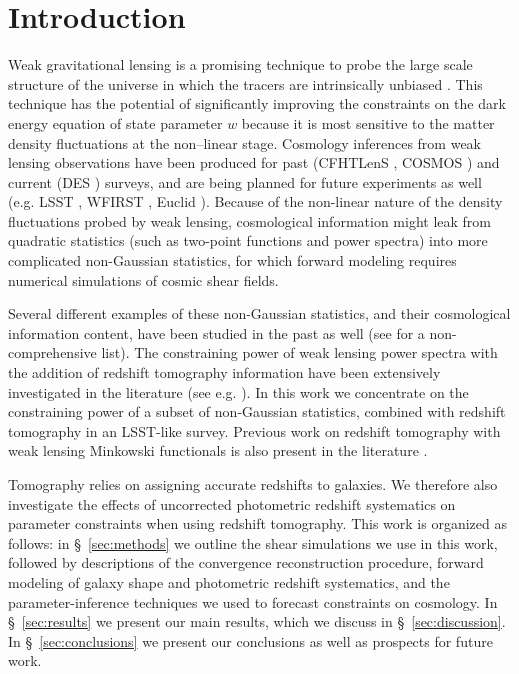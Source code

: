 \documentclass[reprint,aps,prd,superscriptaddress,showkeys,showpacs]{revtex4-1}
\begin{document}
\maketitle



\section{Introduction}
%
Weak gravitational lensing is a promising technique to probe the large scale structure of the universe in which the tracers are intrinsically unbiased \citep{wlreview}. This technique has the potential of significantly improving the constraints on the dark energy equation of state parameter $w$ because it is most sensitive to the matter density fluctuations at the non--linear stage. Cosmology inferences from weak lensing observations have been produced for past (CFHTLenS \citep{cfht1}, COSMOS \citep{cosmos}) and current (DES \citep{DES}) surveys, and are being planned for future experiments as well (e.g. LSST \citep{LSST}, WFIRST \citep{WFIRST}, Euclid \citep{Euclid}). Because of the non-linear nature of the density fluctuations probed by weak lensing, cosmological information might leak from quadratic statistics (such as two-point functions and power spectra) into more complicated non-Gaussian statistics, for which forward modeling requires numerical simulations of cosmic shear fields. 

Several different examples of these non-Gaussian statistics, and their cosmological information content, have been studied in the past as well (see \citep{MinkJan,PeaksJan,NG-Marian,NG-Jain1,NG-Jain2,NG-Jain3,NG-Refregier,NG-Dietrich} for a non-comprehensive list). The constraining power of weak lensing power spectra with the addition of redshift tomography information have been extensively investigated in the literature (see e.g. \citep{SongKnox,FangHaiman07,Huterer2006}). In this work we concentrate on the constraining power of a subset of non-Gaussian statistics, combined with redshift tomography in an LSST-like survey. Previous work on redshift tomography with weak lensing Minkowski functionals is also present in the literature \citep{MinkJan}. 

Tomography relies on assigning accurate redshifts to galaxies. We therefore also investigate the effects of uncorrected photometric redshift systematics on parameter constraints when using redshift tomography. This work is organized as follows: in \S~\ref{sec:methods} we outline the shear simulations we use in this work, followed by descriptions of the convergence reconstruction procedure, forward modeling of galaxy shape and photometric redshift systematics, and the parameter-inference techniques we used to forecast constraints on cosmology. In \S~\ref{sec:results} we present our main results, which we discuss in \S~\ref{sec:discussion}. In \S~\ref{sec:conclusions} we present our conclusions as well as prospects for future work.  
\end{document}
